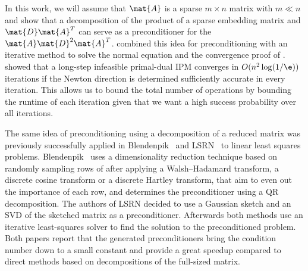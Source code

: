 In this work, we will assume that \(\mat{A}\) is a sparse \(m \times n\) matrix with \(m \ll n\) and show that a decomposition of the product of a sparse embedding matrix and \(\mat{D}\mat{A}^T\) can serve as a preconditioner for the \(\mat{A}\mat{D}^2\mat{A}^T\).
\Textcite{Avron-FasterRandomizedInfeasibleIPMs} combined this idea for preconditioning with an iterative method to solve the normal equation and the convergence proof of \textcite{Monteiro-ConvergenceAnalysisLongStepInfeasibleIPMs}.
\Textcite{Monteiro-ConvergenceAnalysisLongStepInfeasibleIPMs} showed that a long-step infeasible primal-dual IPM converges in \(O(n^2 \log(1/\e))\) iterations if the Newton direction is determined sufficiently accurate in every iteration.
This allows us to bound the total number of operations by bounding the runtime of each iteration given that we want a high success probability over all iterations.

The same idea of preconditioning using a decomposition of a reduced matrix was previously successfully applied in Blendenpik~\cite{Avron-Blendenpik} and LSRN~\cite{MengSaundersMahoney-LSRN} to linear least squares problems.
Blendenpik~\cite{Avron-Blendenpik} uses a dimensionality reduction technique based on randomly sampling rows of after applying a Walsh--Hadamard transform, a discrete cosine transform or a discrete Hartley transform, that aim to even out the importance of each row, and determines the preconditioner using a QR decomposition.%
The authors of LSRN \textcite{MengSaundersMahoney-LSRN} decided to use a Gaussian sketch and an SVD of the sketched matrix as a preconditioner.
Afterwards both methods use an iterative least-squares solver to find the solution to the preconditioned problem.
Both papers report that the generated preconditioners bring the condition number down to a small constant and provide a great speedup compared to direct methods based on decompositions of the full-sized matrix.

